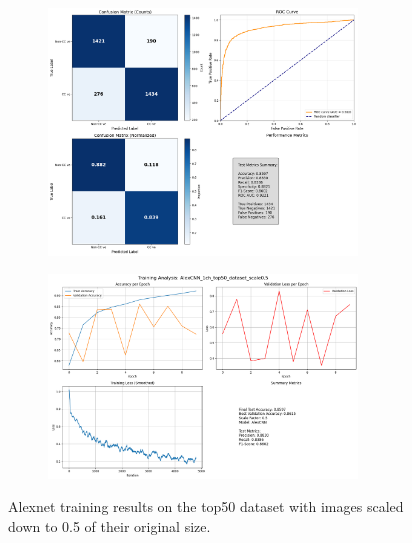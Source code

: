 \documentclass{pracalicmgr}
\begin{document}
\newpage

\begin{figure}[H]
    \centering
    \begin{subfigure}{\textwidth}
        \centering
        \includegraphics[width=0.9\textwidth]{src/AlexCNN_1ch_top50_dataset_scale0.5.png}
        \label{fig:top5005sub1}
    \end{subfigure}
    
    \vspace{1cm}
    
    \begin{subfigure}{\textwidth}
        \centering
        \includegraphics[width=0.9\textwidth]{src/AlexCNN_1ch_top50_dataset_scale05losses.png}
        \label{fig:top5005sub2}
    \end{subfigure}
    \caption{Alexnet training results on the top50 dataset with images scaled down to 0.5 of their original size.}
    \label{fig:top5005stacked}
\end{figure}
\end{document}

